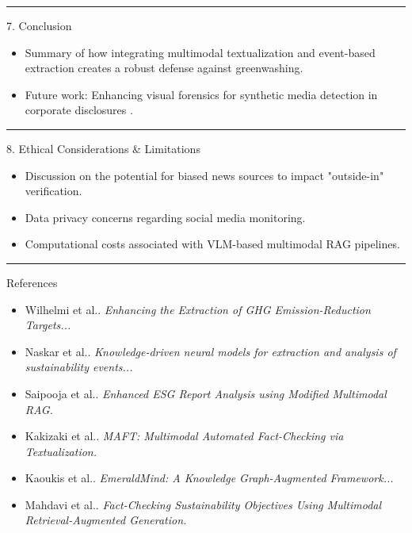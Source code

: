\documentclass{article}
\begin{document}
\begin{center}\rule{\linewidth}{0.5pt}\end{center}
7. Conclusion
\begin{itemize}
\item 

Summary of how integrating multimodal textualization  \parencite{kazuya_kakizaki_4193ad80} and event-based extraction  \parencite{abir_naskar_17efeb7b} creates a robust defense against greenwashing.\item 

Future work: Enhancing visual forensics for synthetic media detection in corporate disclosures  \parencite{vinh_nguyen_phan_020d3d5e}.
\end{itemize}
\begin{center}\rule{\linewidth}{0.5pt}\end{center}
8. Ethical Considerations \& Limitations
\begin{itemize}
\item 

Discussion on the potential for biased news sources to impact "outside-in" verification.\item 

Data privacy concerns regarding social media monitoring.\item 

Computational costs associated with VLM-based multimodal RAG pipelines.
\end{itemize}
\begin{center}\rule{\linewidth}{0.5pt}\end{center}
References
\begin{itemize}
\item 

 \parencite{lars_wilhelmi_8d7e860b} Wilhelmi et al.. \textit{Enhancing the Extraction of GHG Emission-Reduction Targets...}\item 

 \parencite{abir_naskar_17efeb7b} Naskar et al.. \textit{Knowledge-driven neural models for extraction and analysis of sustainability events...}\item 

 \parencite{g_saipooja_m_n_488bfdd6} Saipooja et al.. \textit{Enhanced ESG Report Analysis using Modified Multimodal RAG.}\item 

 \parencite{kazuya_kakizaki_4193ad80} Kakizaki et al.. \textit{MAFT: Multimodal Automated Fact-Checking via Textualization.}\item 

 \parencite{kaoukis__georgios_35bab107} Kaoukis et al.. \textit{EmeraldMind: A Knowledge Graph-Augmented Framework...}\item 

 \parencite{mohammad_mahdavi_619c09a8} Mahdavi et al.. \textit{Fact-Checking Sustainability Objectives Using Multimodal Retrieval-Augmented Generation.}
\end{itemize}
\printbibliography
\end{document}
